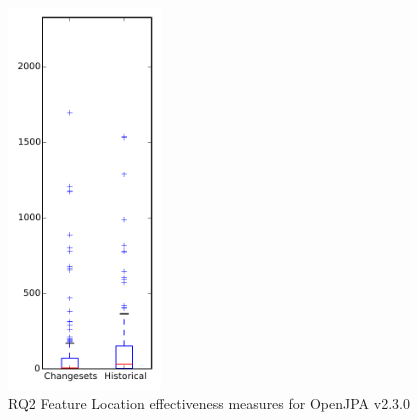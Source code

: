 
\begin{figure}[t]
\centering
\includegraphics[width=0.36\textwidth]{figures/flt/rq2_openjpa}
\caption{RQ2 Feature Location effectiveness measures for OpenJPA v2.3.0}
\label{fig:flt:rq2:openjpa}
\end{figure}
